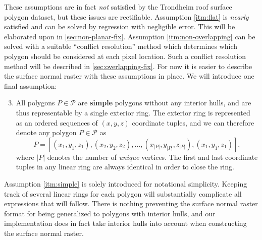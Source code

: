 These assumptions are in fact \emph{not} satisfied by the Trondheim roof surface polygon dataset, but these issues are rectifiable.
Assumption \ref{itm:flat} is \textit{nearly} satisfied and can be solved by regression with negligible error.
This will be elaborated upon in \cref{sec:non-planar-fix}.
Assumption \ref{itm:non-overlapping} can be solved with a suitable \enquote{conflict resolution} method which determines which polygon should be considered at each pixel location.
Such a conflict resolution method will be described in \cref{sec:overlapping-fix}.
For now it is easier to describe the surface normal raster with these assumptions in place.
We will introduce one final assumption:
\begin{enumerate}[label=\bfseries\sffamily A\arabic*, ref=A\arabic*]
  \setcounter{enumi}{2}
  \item \label{itm:simple} All polygons $P \in \mathcal{P}$ are \textbf{simple} polygons without any interior hulls, and are thus representable by a single exterior ring.
    The exterior ring is represented as an ordered sequences of $(x, y, z)$ coordinate tuples, and we can therefore denote any polygon $P \in \mathcal{P}$ as
    \begin{equation*}
      P = [(x_1, y_1, z_1), (x_2, y_2, z_2), \dots, (x_{|P|}, y_{|P|}, z_{|P|}), (x_1, y_1, z_1)],
    \end{equation*}
    where $|P|$ denotes the number of \emph{unique} vertices.
    The first and last coordinate tuples in any linear ring are always identical in order to close the ring.
\end{enumerate}
Assumption \ref{itm:simple} is solely introduced for notational simplicity.
Keeping track of several linear rings for each polygon will substantially complicate all expressions that will follow.
There is nothing preventing the surface normal raster format for being generalized to polygons with interior hulls, and our implementation does in fact take interior hulls into account when constructing the surface normal raster.

